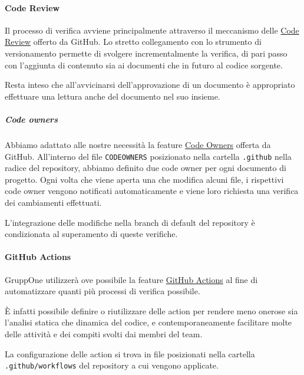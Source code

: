 \documentclass[../norme-di-progetto.tex]{subfiles}
\begin{document}
\paragraph{Code Review}%
\label{par:code_review}

Il processo di verifica avviene principalmente attraverso il meccanismo delle \href{https://github.com/features/code-review/}{Code Review} offerto da GitHub.
Lo stretto collegamento con lo strumento di versionamento permette di svolgere incrementalmente la verifica, di pari passo con l'aggiunta di contenuto sia ai documenti che in futuro al codice sorgente.

Resta inteso che all'avvicinarsi dell'approvazione di un documento è appropriato effettuare una lettura anche del documento nel suo insieme.


\subparagraph{Code owners}%
\label{subp:code_owners}

Abbiamo adattato alle nostre necessità la feature \href{https://help.github.com/en/github/creating-cloning-and-archiving-repositories/about-code-owners}{Code Owners} offerta da GitHub.
All'interno del file \verb|CODEOWNERS| posizionato nella cartella \verb|.github| nella radice del repository, abbiamo definito due code owner per ogni documento di progetto.
Ogni volta che viene aperta una  che modifica alcuni file, i rispettivi code owner vengono notificati automaticamente e viene loro richiesta una verifica dei cambiamenti effettuati.

L'integrazione delle modifiche nella branch di default del repository è condizionata al superamento di queste verifiche.

\paragraph{GitHub Actions}%
\label{par:github_actions}

GruppOne utilizzerà ove possibile la feature \href{https://help.github.com/en/actions/automating-your-workflow-with-github-actions/about-github-actions}{GitHub Actions} al fine di automatizzare quanti più processi di verifica possibile.

È infatti possibile definire o riutilizzare delle action per rendere meno onerose sia l'analisi statica che dinamica del codice, e contemporaneamente facilitare molte delle attività e dei compiti svolti dai membri del team.

La configurazione delle action si trova in file  posizionati nella cartella \verb|.github/workflows| del repository a cui vengono applicate.
\end{document}
